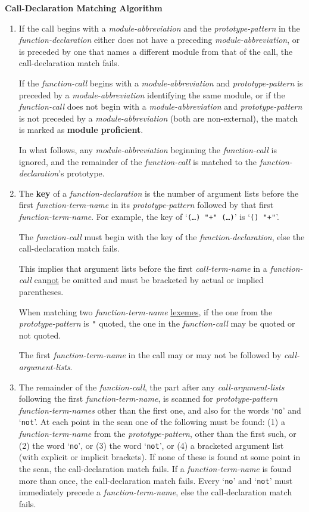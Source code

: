 \documentclass[12pt]{article}
\newcommand{\key}[1]{{\rm \bfseries #1}}
\begin{document}
\centerline{\bf Call-Declaration Matching Algorithm}
\begin{enumerate}
\item\label{CALL-DECLARATION-MODULE-ABBREVIATION}
If the call begins with a {\em module-abbreviation}
and the {\em prototype-pattern} in the {\em function-declaration}
either does not have a preceding {\em module-abbreviation},
or is preceded by one that names a different module from that of the call,
the call-declaration match fails.

If the {\em function-call} begins with a {\em module-abbreviation}
and {\em prototype-pattern} is preceded by a {\em module-abbreviation}
identifying the same module, or
if the {\em function-call} does not begin with a {\em module-abbreviation}
and {\em prototype-pattern} is not preceded by a {\em module-abbreviation}
(both are non-external),
the match is marked as \key{module proficient}\label{MODULE-PROFICIENT}.

In what follows, any {\em module-abbreviation} beginning the
{\em function-call} is ignored, and the remainder of the {\em function-call}
is matched to the {\em function-declaration}'s prototype.

\item\label{CALL-DECLARATION-KEY}
The \key{key} of a {\em function-declaration}
is the number of argument lists before
the first {\em function-term-name} in its {\em prototype-pattern}
followed by that first
{\em function-term-name}.  For example, the key of
`{\tt (\ldots) "+" (\ldots)}' is `{\tt () "+"}'.

The {\em function-call} must begin with the key of the
{\em function-declaration}, else the call-declaration match fails.

This implies that argument lists before the first {\em call-term-name}
in a {\em function-call} can\underline{not} be omitted and must be bracketed
by actual or implied parentheses.

When matching two {\em function-term-name} \underline{lexemes}, if the one from
the {\em prototype-pattern} is {\tt "} quoted, the
one in the {\em function-call} may be quoted or not quoted.

The first {\em function-term-name} in the call may or may not be followed by
{\em call-argument-lists}.


\item\label{CALL-DECLARATION-TERM-NAMES}
The remainder of the {\em function-call}, the part after any
{\em call-argument-lists} following the first {\em function-term-name},
is scanned for {\em prototype-pattern}
{\em function-term-names} other than the first one, and also for
the words `{\tt no}' and `{\tt not}'.  At each point in the scan
one of the following must be found: (1) a {\em function-term-name} from
the {\em prototype-pattern}, other than the first such, or
(2) the word `{\tt no}', or (3) the word `{\tt not}', or
(4) a bracketed argument list (with explicit or
implicit brackets).
If none of these is found at some point in the scan,
the call-declaration match fails.  If a {\em function-term-name} is
found more than once, the call-declaration match fails.
Every `{\tt no}' and `{\tt not}' must immediately precede a
{\em function-term-name}, else the call-declaration match fails.


\end{enumerate}
\end{document}
